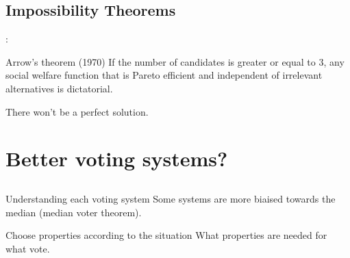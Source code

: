 \documentclass[utf8]{earlywinter}
\begin{document}
\subsection{Impossibility Theorems}
\begin{frame}{\secname: \subsecname}

  \begin{block}{Arrow's theorem (1970)}
    If the number of candidates is greater or equal to 3, any social welfare function that is Pareto efficient and independent of irrelevant alternatives is dictatorial.
  \end{block}

  \begin{alertblock}{There won't be a perfect solution.}
  \end{alertblock}

\end{frame}


 
\section[Solutions]{Better voting systems?}

\subsection{ }
\begin{frame}{\secname}

  \begin{exampleblock}{Understanding each voting system}
    Some systems are more biaised towards the median (median voter theorem).
  \end{exampleblock}

  \begin{exampleblock}{Choose properties according to the situation}
    What properties are needed for what vote.
  \end{exampleblock}

\end{frame}
\end{document}
